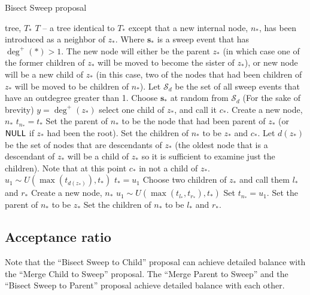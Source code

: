 \documentclass[letterpaper]{article}
\newcommand{\sweep}[1]{{\ensuremath{\mathbf{s}_{#1}}}}
\newcommand{\sweeptime}[1]{{\ensuremath{t_{#1}}}}
\newcommand{\sweeploc}[1]{{\ensuremath{z_{#1}}}}
\newcommand{\outdegConnectedSweepSet}{{\ensuremath{\mathcal{S}_d}}}
\newcommand{\NULL}{{\ensuremath{\mbox{{\bf \sf NULL}}}}}
\newcommand{\outdegree}[1]{{\ensuremath{\deg^{+}\left(#1\right)}}}
\begin{document}
\begin{algorithm} 
\caption{Bisect Sweep proposal}
\label{bst}
\begin{algorithmic}[1]
	\REQUIRE tree, $T_*$
	\ENSURE $T$ -- a tree identical to $T_*$ except that a new internal node,  $n_*$, has been introduced as a neighbor of $\sweeploc{*}$. Where $\sweep{*}$ is a sweep event that has $\outdegree{*}>1$. The new node will either be the parent $\sweeploc{*}$ (in which case one of the former children of $\sweeploc{*}$ will be moved to become the sister of $\sweeploc{*}$), or new node will be a new child of $\sweeploc{*}$ (in this case, two of the nodes that had been children of $\sweeploc{*}$ will be moved to be children of $n_*$).
	\STATE Let $\outdegConnectedSweepSet $ be the set of all sweep events that have an outdegree greater than 1.
	\IF{$\outdegConnectedSweepSet = \emptyset$}
	\ENDIF
	\STATE Choose $\sweep{*}$ at random from $\outdegConnectedSweepSet $
	\STATE (For the sake of brevity) $y = \outdegree{\sweeploc{*}}$
		\STATE select one child of $\sweeploc{*}$, and call it $c_{*}$.
		\STATE Create a new node, $n_*$
		\STATE $t_{n_{*}}=\sweeptime{*}$
		\STATE Set the parent of $n_*$ to be the node that had been parent of $\sweeploc{*}$ (or $\NULL$ if $\sweeploc{*}$ had been the root).
		\STATE Set the children of $n_*$ to be $\sweeploc{*}$ and $c_*$.
		\STATE Let $d(\sweeploc{*})$ be the set of nodes that are descendants of $\sweeploc{*}$ (the oldest node that is a descendant of $\sweeploc{*}$ will be a child of $\sweeploc{*}$ so it is sufficient to examine just the children). Note that at this point $c_*$ in not a child of $\sweeploc{*}$.
		\STATE  $u_1 \sim U(\max({t_{d(\sweeploc{*})}}),\sweeptime{*})$
		\STATE $\sweeptime{*} = u_1$
	\ELSE
		\STATE Choose two children of $\sweeploc{*}$ and call them $l_*$ and $r_*$ 
		\STATE Create a new node, $n_*$
		\STATE  $u_1 \sim U(\max(t_{l_*},t_{r_*}),\sweeptime{*})$
		\STATE Set $t_{n_{*}}=u_1$. 
		\STATE Set the parent of $n_*$ to be $\sweeploc{*}$
		\STATE Set the children of $n_*$ to be $l_*$ and $r_*$.
	\ENDIF
\end{algorithmic}
\end{algorithm} 
\subsection{Acceptance ratio}
Note that the ``Bisect Sweep to Child'' proposal can achieve detailed balance with the ``Merge Child to Sweep'' proposal.
The ``Merge Parent to Sweep'' and the ``Bisect Sweep to Parent'' proposal achieve detailed balance with each other.
\end{document}
